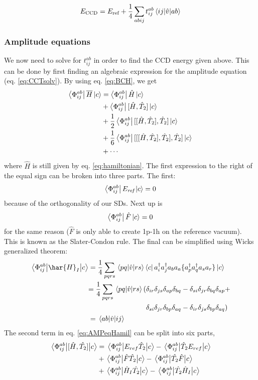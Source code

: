 \documentclass[a4paper,12pt]{article}
\newcommand{\hatH}{\hat{H}}
\newcommand{\hatTt}{\hat{T}_2}
\newcommand{\brak}[2]{\mel{#1}{\hat{v}}{#2}}
\begin{document}
\begin{equation}
\label{eq:CCDENERGY}
E_{\text{CCD}}=E_{\text{ref}}+\frac{1}{4}\sum_{abij}t_{ij}^{ab}\brak{ij}{ab}
\end{equation}

\subsubsection{Amplitude equations}
We now need to solve for $t_{ij}^{ab}$ in order to find the CCD energy given above. This can be done by first finding an algebraic expression for the amplitude equation (eq. \ref{eq:CCTsolv}). By using eq. \ref{eq:BCH}, we get
\begin{align}
    \label{eq:AMPeqHamil}
    \bra{\Phi_{ij}^{ab}} \overline{H} \ket{c} &= \bra{\Phi_{ij}^{ab}} \hat{H} \ket{c} \notag \\
    & + \bra{\Phi_{ij}^{ab}} [\hat{H},\hat{T}_2] \ket{c} \notag \\
     &+ \frac{1}{2} \bra{\Phi_{ij}^{ab}} [[\hat{H},\hat{T}_2],\hat{T}_2] \ket{c} \\
     &+ \frac{1}{6} \bra{\Phi_{ij}^{ab}} [[[\hatH,\hatTt],\hatTt],\hatTt] \ket{c} \notag \\
     &+ \cdots \notag 
\end{align}
where $\hat{H}$ is still given by eq. \ref{eq:hamiltonian}. The first expression to the right of the equal sign can be broken into three parts. The first:
$$\bra{\Phi_{ij}^{ab}} E_{\textit{ref}} \ket{c} = 0$$
because of the orthogonality of our SDs. Next up is
$$\bra{\Phi_{ij}^{ab}} \hat{F} \ket{c} = 0$$
for the same reason ($\hat{F}$ is only able to create 1p-1h on the reference vacuum). This is known as the Slater-Condon rule.
The final can be simplified using Wicks generalized theorem:
\begin{align*}
\mel{\Phi_{ij}^{ab}}{\har{H}_I}{c} &= \frac{1}{4} \sum_{pqrs}\brak{pq}{rs} \bra{c}a^\dagger_i a^\dagger_j a_b a_a \{a^\dagger_p a^\dagger_q a_s a_r \} \ket{c}\\
&
\begin{aligned}
=\frac{1}{4}\sum_{pqrs}\brak{pq}{rs}(&\delta_{ir}\delta_{js}\delta_{ap}\delta_{bq} - \delta_{si}\delta_{jr}\delta_{bq}\delta_{ap} + \\ & \delta_{si}\delta_{jr}\delta_{bp}\delta_{aq} - \delta_{ir}\delta_{js}\delta_{bp}\delta_{aq})
\end{aligned} \\
& = \brak{ab}{ij}
\end{align*}
The second term in eq. \ref{eq:AMPeqHamil} can be split into six parts, 
\begin{align*}
    \mel{\Phi_{ij}^{ab}}{[\hatH,\hat{T_2}]}{c} &= \mel{\Phi_{ij}^{ab}}{E_{ref}\hatTt}{c} - \mel{\Phi_{ij}^{ab}}{\hatTt E_{ref}}{c} \\ &+ \mel{\Phi_{ij}^{ab}}{\hat{F}\hat{T_2}}{c}-\mel{\Phi_{ij}^{ab}}{\hat{T_2}\hat{F}}{c}\\
    &+\mel{\Phi_{ij}^{ab}}{\hat{H}_I\hat{T_2}}{c}-\mel{\Phi_{ij}^{ab}}{\hat{T_2}\hat{H}_I}{c}
\end{align*}
\end{document}
